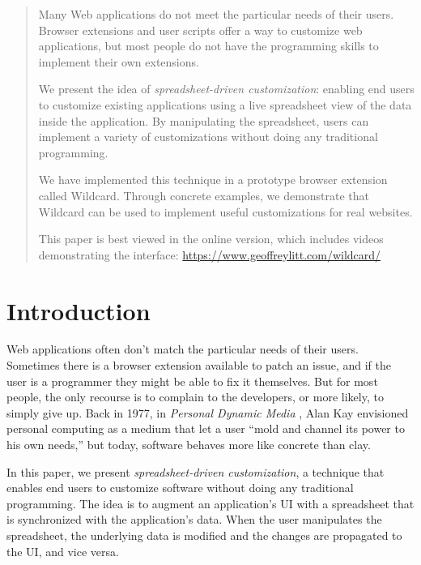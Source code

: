 \documentclass[english,submission]{programming}
\begin{document}
\maketitle

\begin{abstract}
Many Web applications do not meet the particular needs of their users.
Browser extensions and user scripts offer a way to customize web
applications, but most people do not have the programming skills to
implement their own extensions.

We present the idea of \emph{spreadsheet-driven customization}: enabling
end users to customize existing applications using a live spreadsheet
view of the data inside the application. By manipulating the
spreadsheet, users can implement a variety of customizations without
doing any traditional programming.

We have implemented this technique in a prototype browser extension
called Wildcard. Through concrete examples, we demonstrate that Wildcard
can be used to implement useful customizations for real websites.

This paper is best viewed in the online version, which includes videos demonstrating the interface: \url{https://www.geoffreylitt.com/wildcard/}
\end{abstract}


\hypertarget{sec:introduction}{%
\section{Introduction}\label{sec:introduction}}

Web applications often don't match the particular needs of their users.
Sometimes there is a browser extension available to patch an issue, and
if the user is a programmer they might be able to fix it themselves. But
for most people, the only recourse is to complain to the developers, or
more likely, to simply give up. Back in 1977, in \emph{Personal Dynamic
Media} \autocite{kay1977}, Alan Kay envisioned personal computing as a
medium that let a user ``mold and channel its power to his own needs,''
but today, software behaves more like concrete than clay.

In this paper, we present \emph{spreadsheet-driven customization}, a
technique that enables end users to customize software without doing any
traditional programming. The idea is to augment an application's UI with
a spreadsheet that is synchronized with the application's data. When the
user manipulates the spreadsheet, the underlying data is modified and
the changes are propagated to the UI, and vice versa.
\end{document}
